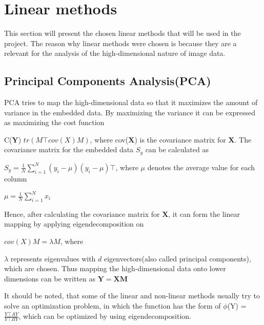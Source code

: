 \section*{Linear methods}
This section will present the chosen linear methods that will be used in the project. The reason why linear methods were chosen is because they are a relevant for the analysis of the high-dimensional nature of image data.\cite{Cunningham}

\begin{comment}
@misc{Cunningham,
      organization = {Journal of Machine Learning Research},
      url          = {https://stat.columbia.edu/~cunningham/pdf/CunninghamJMLR2015.pdf},
      title        = {Linear Dimensionality Reduction:Survey, Insights, and Generalizations},
      author       = {John P. Cunningham, Zoubin Ghahramani},
      urldate      = {2022-10-11}
    }
\end{comment}


\subsection*{Principal Components Analysis(PCA)}
PCA tries to map the high-dimensional data so that it maximizes the amount of variance in the embedded data. By maximizing the variance it can be expressed as maximizing the cost function

C($\mathbf{Y}$) $tr(M \top cov(X)M)$, where cov($\mathbf{X}$) is the covariance matrix for $\mathbf{X}$. The covariance matrix for the embedded data $S_y$ can be calculated as

$S_y = \frac{1}{N}\sum\limits_{i=1}^{N}(y_i - \mu)(y_i - \mu)\top$, where $\mu$ denotes the average value for each column

$\mu = \frac{1}{N}\sum\limits_{i=1}^{N}x_i$ 

Hence, after calculating the covariance matrix for $\mathbf{X}$, it can form the linear mapping by applying eigendecomposition on

$cov(X)M = \lambda M$, where

$\lambda$ represents eigenvalues with $d$ eigenvectors(also called principal components), which are chosen. Thus mapping the high-dimensional data onto lower dimensions can be written as $\mathbf{Y=XM}$

It should be noted, that some of the linear and non-linear methods usually try to solve an optimization problem, in which the function has the form of $\phi$(Y) = $\frac{Y\top AY}{Y\top BY}$, which can be optimized by using eigendecomposition.\cite{LVD}

